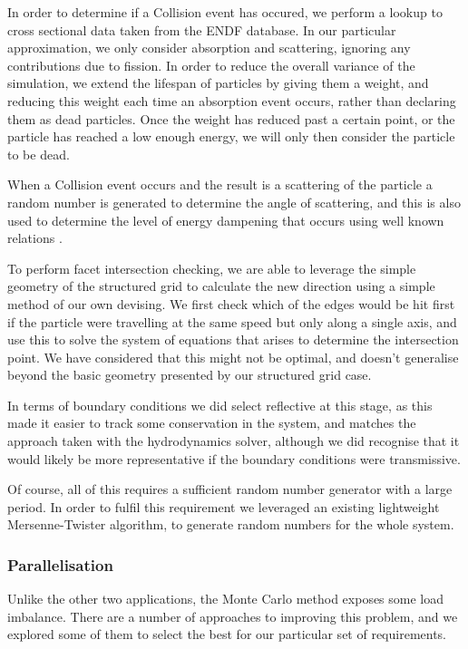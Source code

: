 \documentclass[runningheads,a4paper]{llncs}
\begin{document}
In order to determine if a Collision event has occured, we perform a lookup to cross sectional data taken from the ENDF database. In our particular approximation, we only consider absorption and scattering, ignoring any contributions due to fission. In order to reduce the overall variance of the simulation, we extend the lifespan of particles by giving them a weight, and reducing this weight each time an absorption event occurs, rather than declaring them as dead particles. Once the weight has reduced past a certain point, or the particle has reached a low enough energy, we will only then consider the particle to be dead.

When a Collision event occurs and the result is a scattering of the particle a random number is generated to determine the angle of scattering, and this is also used to determine the level of energy dampening that occurs using well known relations \cite{}.

To perform facet intersection checking, we are able to leverage the simple geometry of the structured grid to calculate the new direction using a simple method of our own devising. We first check which of the edges would be hit first if the particle were travelling at the same speed but only along a single axis, and use this to solve the system of equations that arises to determine the intersection point. We have considered that this might not be optimal, and doesn't generalise beyond the basic geometry presented by our structured grid case.

In terms of boundary conditions we did select reflective at this stage, as this made it easier to track some conservation in the system, and matches the approach taken with the hydrodynamics solver, although we did recognise that it would likely be more representative if the boundary conditions were transmissive.

Of course, all of this requires a sufficient random number generator with a large period. In order to fulfil this requirement we leveraged an existing lightweight Mersenne-Twister algorithm, to generate random numbers for the whole system.

\subsubsection{Parallelisation}

Unlike the other two applications, the Monte Carlo method exposes some load imbalance. There are a number of approaches to improving this problem, and we explored some of them to select the best for our particular set of requirements. 
\end{document}
